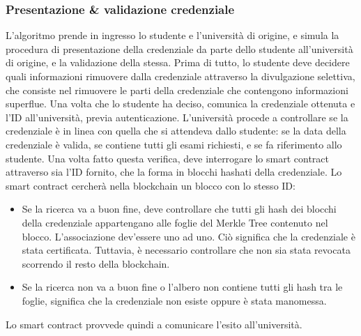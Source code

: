 \documentclass[a4paper,12pt]{article}
\begin{document}
\subsubsection{Presentazione \& validazione credenziale}
L'algoritmo prende in ingresso lo studente e l'università di origine, e simula la procedura di presentazione della credenziale da parte dello studente all'università di origine, e la validazione della stessa. Prima di tutto, lo studente deve decidere quali informazioni rimuovere dalla credenziale attraverso la divulgazione selettiva, che consiste nel rimuovere le parti della credenziale che contengono informazioni superflue. Una volta che lo studente ha deciso, comunica la credenziale ottenuta e l'ID all'università, previa autenticazione. L'università procede a controllare se la credenziale è in linea con quella che si attendeva dallo studente: se la data della credenziale è valida, se contiene tutti gli esami richiesti, e se fa riferimento allo studente. Una volta fatto questa verifica, deve interrogare lo smart contract attraverso sia l'ID fornito, che la forma in blocchi hashati della credenziale. Lo smart contract cercherà nella blockchain un blocco con lo stesso ID:
\begin{itemize}
    \item Se la ricerca va a buon fine, deve controllare che tutti gli hash dei blocchi della credenziale appartengano alle foglie del Merkle Tree contenuto nel blocco. L'associazione dev'essere uno ad uno. Ciò significa che la credenziale è stata certificata. Tuttavia, è necessario controllare che non sia stata revocata scorrendo il resto della blockchain.
    \item Se la ricerca non va a buon fine o l'albero non contiene tutti gli hash tra le foglie, significa che la credenziale non esiste oppure è stata manomessa.
\end{itemize}
Lo smart contract provvede quindi a comunicare l'esito all'università.
\end{document}

